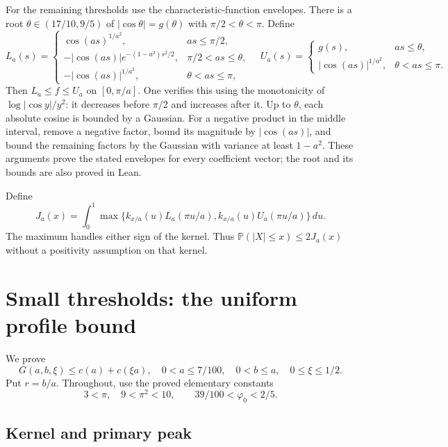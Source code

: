 \documentclass[11pt]{article}
\newcommand{\Pp}{\mathbb P}
\newcommand{\phz}{\varphi_0}
\begin{document}
For the remaining thresholds use the characteristic-function envelopes.
There is a root $\theta\in(17/10,9/5)$ of
$|\cos\theta|=g(\theta)$ with $\pi/2<\theta<\pi$. Define
\[
 L_a(s)=\begin{cases}
 \cos(as)^{1/a^2},&as\le\pi/2,\\
 -|\cos(as)|e^{-(1-a^2)s^2/2},&\pi/2<as\le\theta,\\
 -|\cos(as)|^{1/a^2},&\theta<as\le\pi,
 \end{cases}
\quad
 U_a(s)=\begin{cases}g(s),&as\le\theta,\\
 |\cos(as)|^{1/a^2},&\theta<as\le\pi.
 \end{cases}
\]
Then $L_a\le f\le U_a$ on $[0,\pi/a]$. One verifies this using the monotonicity
of $\log|\cos y|/y^2$: it decreases before $\pi/2$ and increases after it.
Up to $\theta$, each absolute cosine is bounded by a Gaussian. For a negative
product in the middle interval, remove a negative factor, bound its magnitude
by $|\cos(as)|$, and bound the remaining factors by the Gaussian with variance
at least $1-a^2$. These arguments prove the stated envelopes for every
coefficient vector; the root and its bounds are also proved in Lean.

Define
\begin{equation}\label{eq:J}
 J_a(x)=\int_0^1\max\{k_{x/a}(u)L_a(\pi u/a),
                         k_{x/a}(u)U_a(\pi u/a)\}\,du.
\end{equation}
The maximum handles either sign of the kernel. Thus
$\Pp(|X|\le x)\le2J_a(x)$ without a positivity assumption on that kernel.

\section{Small thresholds: the uniform profile bound}

We prove
\begin{equation}\label{eq:Agoal}
 G(a,b,\xi)\le c(a)+c(\xi a),
 \quad 0<a\le7/100,\quad0<b\le a,\quad0\le\xi\le1/2.
\end{equation}
Put $r=b/a$. Throughout, use the proved elementary constants
\[
 3<\pi,\quad9<\pi^2<10,\qquad39/100<\phz<2/5.
\]

\subsection{Kernel and primary peak}
\end{document}
